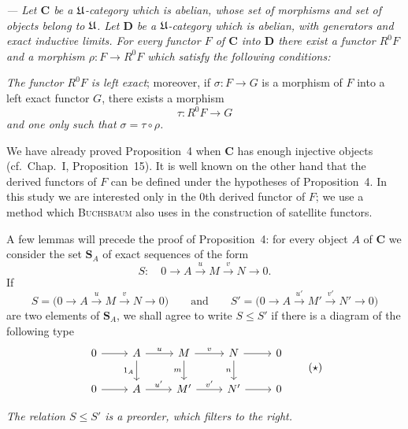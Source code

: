 \begin{proposition}
\itshape
--- Let $\mathbf{C}$ be a $\mathfrak{U}$-category which is abelian, whose set of
morphisms and set of objects belong to $\mathfrak{U}$. Let $\mathbf{D}$ be a
$\mathfrak{U}$-category which is abelian, with generators and exact inductive
limits. For every functor $F$ of $\mathbf{C}$ into $\mathbf{D}$ there
exist a functor $R^{0}F$ and a morphism $\rho\colon F\to R^{0}F$ which
satisfy the following conditions:

\emph{The functor $R^{0}F$ is left exact}; moreover, if
$\sigma\colon F\to G$ is a morphism of $F$ into a left exact functor $G$,
there exists a morphism
\[
  \tau\colon R^{0}F\to G
\]
\emph{and one only such that $\sigma = \tau\circ\rho$.}
\end{proposition}

We have already proved Proposition~4 when $\mathbf{C}$ has enough injective
objects (cf.\ Chap.~I, Proposition~15). It is well known on the other hand
that the derived functors of $F$ can be defined under the hypotheses of
Proposition~4. In this study we are interested only in the $0$th derived
functor of $F$; we use a method which \textsc{Buchsbaum} also uses in the
construction of satellite functors.

A few lemmas will precede the proof of Proposition~4: for every object $A$
of $\mathbf{C}$ we consider the set $\mathbf{S}_A$ of exact sequences of
the form
\[
  S\colon\quad 0\to A\xrightarrow{u}M\xrightarrow{v}N\to
  0.
\]
If
\[
  S = \bigl(0\to A\xrightarrow{u}M\xrightarrow{v}N\to0\bigr)
  \qquad\text{and}\qquad
  S' = \bigl(0\to A\xrightarrow{u'}M'\xrightarrow{v'}N'\to0\bigr)
\]
are two elements of $\mathbf{S}_A$, we shall agree to write $S\leq S'$
if there is a diagram of the following type
\begin{equation*}
\begin{tikzcd}
0 \arrow[r] &
A \arrow[r, "u"] \arrow[d, "1_A"'] &
M \arrow[r, "v"] \arrow[d, "m"'] &
N \arrow[r] \arrow[d, "n"'] &
0 \\
0 \arrow[r] &
A \arrow[r, "u'"] &
M' \arrow[r, "v'"] &
N' \arrow[r] &
0
\end{tikzcd}
\qquad(\star)
\end{equation*}

\begin{lemma}
\itshape
The relation $S\leq S'$ is a preorder, which filters to the right.
\end{lemma}

